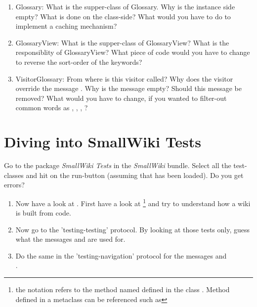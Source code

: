 \begin{enumerate}

\item Glossary: What is the supper-class of Glossary. Why is the
instance side empty? What is done on the class-side? What would
you have to do to implement a caching mechanism?

\item GlossaryView: What is the supper-class of GlossaryView? What is the responsiblity of GlossaryView? What piece of code would you have to change to reverse the sort-order of the keywords?

\item VisitorGlossary: From where is this visitor called? Why does the visitor override the message . Why is the message  empty? Should this message be removed? What would you have to change, if you wanted to filter-out common words as , , ,  ?
\end{enumerate}


\section{Diving into SmallWiki Tests}

\exercise Go to the package \textit{SmallWiki Tests} in the
\textit{SmallWiki} bundle. Select all the test-classes and hit on
the run-button (assuming that  has been
loaded). Do you get errors?

\begin{enumerate}
\item Now have a look at . First have a
look at \footnote{the notation
 refers to the method named
 defined in the class . Method
defined in a metaclass can be referenced such as } and try to understand how a wiki is built
from code.

\item Now go to the 'testing-testing' protocol. By looking at those tests only, guess what the messages  and  are used for.

\item Do the same in the 'testing-navigation' protocol for the
messages  and \\ .
\end{enumerate}

